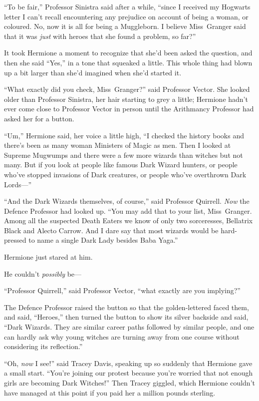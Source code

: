 “To be fair,” Professor Sinistra said after a while, “since I received my Hogwarts letter I can’t recall encountering any prejudice on account of being a woman, or coloured. No, now it is all for being a Muggleborn. I believe Miss~Granger said that it was \emph{just} with heroes that she found a problem, so far?”

It took Hermione a moment to recognize that she’d been asked the question, and then she said “Yes,” in a tone that squeaked a little. This whole thing had blown up a bit larger than she’d imagined when she’d started it.

“What exactly did you check, Miss~Granger?” said Professor Vector. She looked older than Professor Sinistra, her hair starting to grey a little; Hermione hadn’t ever come close to Professor Vector in person until the Arithmancy Professor had asked her for a button.

“Um,” Hermione said, her voice a little high, “I checked the history books and there’s been as many woman Ministers of Magic as men. Then I looked at Supreme Mugwumps and there were a few more wizards than witches but not many. But if you look at people like famous Dark Wizard hunters, or people who’ve stopped invasions of Dark creatures, or people who’ve overthrown Dark Lords—”

“And the Dark Wizards themselves, of course,” said Professor Quirrell. \emph{Now} the Defence Professor had looked up. “You may add that to your list, Miss~Granger. Among all the suspected Death Eaters we know of only two sorceresses, Bellatrix Black and Alecto Carrow. And I dare say that most wizards would be hard-pressed to name a single Dark Lady besides Baba Yaga.”

Hermione just stared at him.

He couldn’t \emph{possibly} be—

“Professor Quirrell,” said Professor Vector, “what exactly are you implying?”

The Defence Professor raised the button so that the golden-lettered \SPHEW faced them, and said, “Heroes,” then turned the button to show its silver backside and said, “Dark Wizards. They are similar career paths followed by similar people, and one can hardly ask why young witches are turning away from one course without considering its reflection.”

“Oh, \emph{now} I see!” said Tracey Davis, speaking up so suddenly that Hermione gave a small start. “You’re joining our protest because you’re worried that not enough girls are becoming Dark Witches!” Then Tracey giggled, which Hermione couldn’t have managed at this point if you paid her a million pounds sterling.

